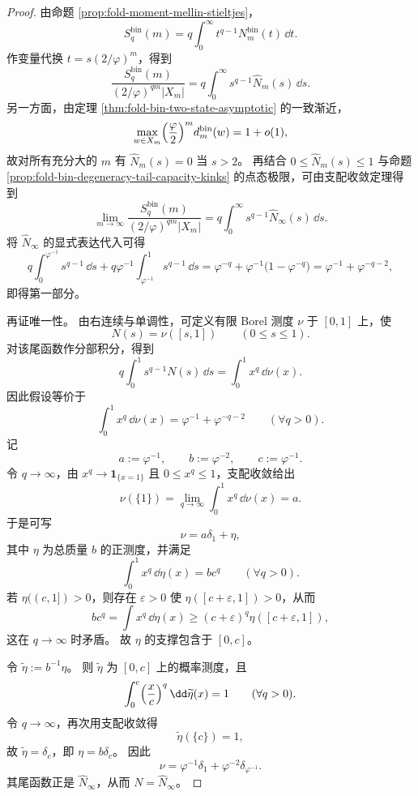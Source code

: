 \begin{proof}
由命题 \ref{prop:fold-moment-mellin-stieltjes}，
\[
S_q^{\mathrm{bin}}(m)=q\int_{0}^{\infty}t^{q-1}N_m^{\mathrm{bin}}(t)\,\dd t.
\]
作变量代换 \(t=s(2/\varphi)^m\)，得到
\[
\frac{S_q^{\mathrm{bin}}(m)}{(2/\varphi)^{qm}|X_m|}
=
q\int_{0}^{\infty}s^{q-1}\widehat N_m(s)\,\dd s.
\]
另一方面，由定理 \ref{thm:fold-bin-two-state-asymptotic} 的一致渐近，
\[
\max_{w\in X_m}\Bigl(\frac{\varphi}{2}\Bigr)^m d_m^{\mathrm{bin}}(w)=1+o(1),
\]
故对所有充分大的 \(m\) 有 \(\widehat N_m(s)=0\) 当 \(s>2\)。
再结合 \(0\le \widehat N_m(s)\le 1\) 与命题 \ref{prop:fold-bin-degeneracy-tail-capacity-kinks} 的点态极限，可由支配收敛定理得到
\[
\lim_{m\to\infty}
\frac{S_q^{\mathrm{bin}}(m)}{(2/\varphi)^{qm}|X_m|}
=
q\int_{0}^{\infty}s^{q-1}\widehat N_\infty(s)\,\dd s.
\]
将 \(\widehat N_\infty\) 的显式表达代入可得
\[
q\int_{0}^{\varphi^{-1}}s^{q-1}\,\dd s
+
q\varphi^{-1}\int_{\varphi^{-1}}^{1}s^{q-1}\,\dd s
=
\varphi^{-q}+\varphi^{-1}\bigl(1-\varphi^{-q}\bigr)
=
\varphi^{-1}+\varphi^{-q-2},
\]
即得第一部分。

再证唯一性。
由右连续与单调性，可定义有限 Borel 测度 \(\nu\) 于 \([0,1]\) 上，使
\[
N(s)=\nu([s,1])\qquad (0\le s\le 1).
\]
对该尾函数作分部积分，得到
\[
q\int_{0}^{1}s^{q-1}N(s)\,\dd s=\int_{0}^{1}x^q\,\dd \nu(x).
\]
因此假设等价于
\[
\int_{0}^{1}x^q\,\dd \nu(x)=\varphi^{-1}+\varphi^{-q-2}
\qquad (\forall q>0).
\]
记
\[
a:=\varphi^{-1},
\qquad
b:=\varphi^{-2},
\qquad
c:=\varphi^{-1}.
\]
令 \(q\to\infty\)，由 \(x^q\to \mathbf 1_{\{x=1\}}\) 且 \(0\le x^q\le 1\)，支配收敛给出
\[
\nu(\{1\})=\lim_{q\to\infty}\int_{0}^{1}x^q\,\dd \nu(x)=a.
\]
于是可写
\[
\nu=a\delta_1+\eta,
\]
其中 \(\eta\) 为总质量 \(b\) 的正测度，并满足
\[
\int_{0}^{1}x^q\,\dd \eta(x)=bc^q
\qquad (\forall q>0).
\]
若 \(\eta((c,1])>0\)，则存在 \(\varepsilon>0\) 使 \(\eta([c+\varepsilon,1])>0\)，从而
\[
bc^q=\int x^q\,\dd \eta(x)\ge (c+\varepsilon)^q\eta([c+\varepsilon,1]),
\]
这在 \(q\to\infty\) 时矛盾。
故 \(\eta\) 的支撑包含于 \([0,c]\)。

令 \(\widetilde \eta:=b^{-1}\eta\)。
则 \(\widetilde \eta\) 为 \([0,c]\) 上的概率测度，且
\[
\int_{0}^{c}\Bigl(\frac{x}{c}\Bigr)^q\,\dd \widetilde \eta(x)=1
\qquad (\forall q>0).
\]
令 \(q\to\infty\)，再次用支配收敛得
\[
\widetilde \eta(\{c\})=1,
\]
故 \(\widetilde \eta=\delta_c\)，即 \(\eta=b\delta_c\)。
因此
\[
\nu=\varphi^{-1}\delta_1+\varphi^{-2}\delta_{\varphi^{-1}}.
\]
其尾函数正是 \(\widehat N_\infty\)，从而 \(N=\widehat N_\infty\)。
\end{proof}

